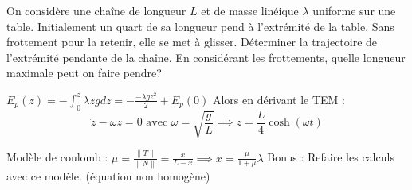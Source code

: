 \begin{Exercise}[title=]
  	On considère une chaîne de longueur $L$ et de masse linéique $\lambda$ uniforme sur une table. Initialement un quart de sa longueur pend à l'extrémité de la table. Sans frottement pour la retenir, elle  se met à glisser.
	\Question  Déterminer la trajectoire de l'extrémité pendante de la chaîne.
	\Question En considérant les frottements, quelle longueur maximale peut on faire pendre?
\end{Exercise}
\begin{Answer}
  	\Question $E_p(z) = -\int_{0}^{z}\lambda z g dz = -\frac{-\lambda g z^2}{2} + E_p(0)$
	Alors en dérivant le TEM :
	\[ \ddot{z} - \omega z = 0 \text{ avec } \omega = \sqrt{\frac{g}{L}} \implies z =\frac{L}{4}\cosh(\omega t) \]

	\Question Modèle de coulomb : $\mu = \frac{\|T\|}{\|N\|} = \frac{x}{L-x} \implies x= \frac{\mu}{1+\mu}\lambda $
	\Question Bonus : Refaire les calculs avec ce modèle. (équation non homogène)
\end{Answer}
